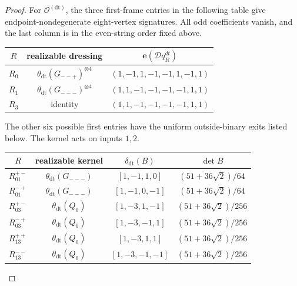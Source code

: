 \documentclass[11pt,letterpaper,onecolumn]{article}
\theoremstyle{plain}
\theoremstyle{definition}
\theoremstyle{remark}
\newcommand{\OctDT}{{\mathcal O^{(\mathrm{dt})}}}
\begin{document}
\begin{proof}
For \(\OctDT\), the three first-frame entries in the following
table give endpoint-nondegenerate eight-vertex signatures.  All odd
coefficients vanish, and the last column is in the even-string order fixed
above.
\begin{center}
\normalsize
\setlength{\tabcolsep}{4pt}
\begin{tabular}{ccc}
\toprule
\(R\)&realizable dressing&\(\mathbf e(\mathscr D q_R^{dt})\)\\
\midrule
\(R_0\)&\(\theta_{\mathrm{dt}}(G_{--+})^{\otimes4}\)&
 \((1,-1,1,-1,-1,1,-1,1)\)\\
\(R_1\)&\(\theta_{\mathrm{dt}}(G_{---})^{\otimes4}\)&
 \((1,1,-1,-1,-1,-1,1,1)\)\\
\(R_3\)&identity&\((1,1,-1,-1,-1,-1,1,1)\)\\
\bottomrule
\end{tabular}
\end{center}
The other six possible first entries have the uniform outside-binary exits
listed below. The kernel acts on inputs \(1,2\).
\begin{center}
\normalsize
\setlength{\tabcolsep}{4pt}
\begin{tabular}{cccc}
\toprule
\(R\)&realizable kernel&\(\delta_{\mathrm{dt}}(B)\)&\(\det B\)\\
\midrule
\(R_{01}^{+-}\)&\(\theta_{\mathrm{dt}}(G_{---})\)&\([1,-1,1,0]\)&
 \((51+36\sqrt2)/64\)\\
\(R_{01}^{-+}\)&\(\theta_{\mathrm{dt}}(G_{---})\)&\([1,-1,0,-1]\)&
 \((51+36\sqrt2)/64\)\\
\(R_{03}^{+-}\)&\(\theta_{\mathrm{dt}}(Q_0)\)&\([1,-3,1,-1]\)&
 \((51+36\sqrt2)/256\)\\
\(R_{03}^{-+}\)&\(\theta_{\mathrm{dt}}(Q_0)\)&\([1,-3,-1,1]\)&
 \((51+36\sqrt2)/256\)\\
\(R_{13}^{++}\)&\(\theta_{\mathrm{dt}}(Q_0)\)&\([1,-3,1,1]\)&
 \((51+36\sqrt2)/256\)\\
\(R_{13}^{--}\)&\(\theta_{\mathrm{dt}}(Q_0)\)&\([1,-3,-1,-1]\)&
 \((51+36\sqrt2)/256\)\\
\bottomrule
\end{tabular}
\end{center}


\end{proof}
\end{document}
